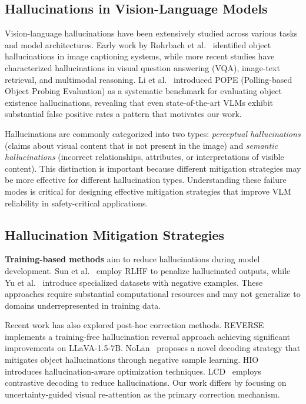 \documentclass[12pt]{article}
\begin{document}
\subsection{Hallucinations in Vision-Language Models}

Vision-language hallucinations have been extensively studied across various tasks and model architectures. Early work by Rohrbach et al.~\citep{rohrbach2018object} identified object hallucinations in image captioning systems, while more recent studies have characterized hallucinations in visual question answering (VQA), image-text retrieval, and multimodal reasoning. Li et al.~\citep{li2023pope} introduced POPE (Polling-based Object Probing Evaluation) as a systematic benchmark for evaluating object existence hallucinations, revealing that even state-of-the-art VLMs exhibit substantial false positive rates a pattern that motivates our work.

\vspace{1em}

Hallucinations are commonly categorized into two types: \textit{perceptual hallucinations} (claims about visual content that is not present in the image) and \textit{semantic hallucinations} (incorrect relationships, attributes, or interpretations of visible content). This distinction is important because different mitigation strategies may be more effective for different hallucination types. Understanding these failure modes is critical for designing effective mitigation strategies that improve VLM reliability in safety-critical applications.


\subsection{Hallucination Mitigation Strategies}

\textbf{Training-based methods} aim to reduce hallucinations during model development. Sun et al.~\citep{sun2023aligning} employ RLHF to penalize hallucinated outputs, while Yu et al.~\citep{yu2023hallucination} introduce specialized datasets with negative examples. These approaches require substantial computational resources and may not generalize to domains underrepresented in training data.

Recent work has also explored post-hoc correction methods. REVERSE~\citep{chen2024reverse} implements a training-free hallucination reversal approach achieving significant improvements on LLaVA-1.5-7B. NoLan~\citep{zhang2024nolan} proposes a novel decoding strategy that mitigates object hallucinations through negative sample learning. HIO~\citep{hio2024} introduces hallucination-aware optimization techniques. LCD~\citep{liu2024lcd} employs contrastive decoding to reduce hallucinations. Our work differs by focusing on uncertainty-guided visual re-attention as the primary correction mechanism.
\end{document}
